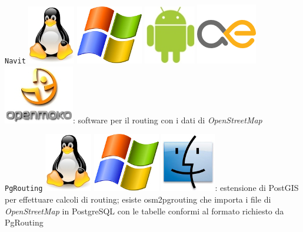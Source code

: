 \documentclass[a4paper,twoside,12pt,]{article}
\newcommand{\osm}{\emph{OpenStreetMap}\xspace}
\newcommand{\soft}[1]{\texttt{#1}}
\begin{document}
\soft{Navit} \includegraphics{./linux-logo.jpg} \includegraphics{./windows-logo.jpg} \includegraphics{./android-logo.jpg} \includegraphics{./maemo-logo.png} \includegraphics{./openmoko-logo.jpg}: software per il routing con i dati di \osm

\soft{PgRouting} \includegraphics{./linux-logo.jpg} \includegraphics{./windows-logo.jpg} \includegraphics{./mac-logo.jpg}: estensione di PostGIS per effettuare calcoli di routing; esiste osm2pgrouting che importa i file di \osm in PostgreSQL con le tabelle conformi al formato richiesto da PgRouting
\end{document}
